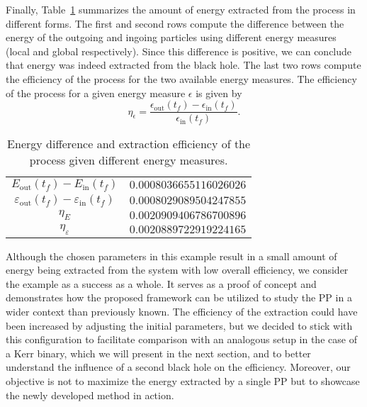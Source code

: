 Finally, Table~\ref{tab:arbitrary_penrose_kerr_example_efficiency} summarizes the amount of energy extracted from the process in different forms. The first and second rows compute the difference between the energy of the outgoing and ingoing particles using different energy measures (local and global respectively). Since this difference is positive, we can conclude that energy was indeed extracted from the black hole. The last two rows compute the efficiency of the process for the two available energy measures. The efficiency of the process for a given energy measure $\epsilon$ is given by
%
\begin{equation}
  \eta_\epsilon = \frac{\epsilon_\text{out}(t_f) - \epsilon_\text{in}(t_f)}{\epsilon_\text{in}(t_f)}.
  \label{eq:arbitrary_penrose_kerr_example_efficiency_formula}
\end{equation}

\begin{table}[]
  \centering
  \begin{tabular}{cc}
    \hline\hline
    $E_\text{out}(t_f)-E_\text{in}(t_f)$                     & $0.0008036655116026026$ \\
    $\varepsilon_\text{out}(t_f)-\varepsilon_\text{in}(t_f)$ & $0.0008029089504247855$ \\
    $\eta_E$                                                 & $0.0020909406786700896$ \\
    $\eta_\varepsilon$                                       & $0.0020889722919224165$ \\ \hline\hline
  \end{tabular}
  \caption{Energy difference and extraction efficiency of the process given different energy measures.}
  \label{tab:arbitrary_penrose_kerr_example_efficiency}
\end{table}

Although the chosen parameters in this example result in a small amount of energy being extracted from the system with low overall efficiency, we consider the example as a success as a whole. It serves as a proof of concept and demonstrates how the proposed framework can be utilized to study the PP in a wider context than previously known. The efficiency of the extraction could have been increased by adjusting the initial parameters, but we decided to stick with this configuration to facilitate comparison with an analogous setup in the case of a Kerr binary, which we will present in the next section, and to better understand the influence of a second black hole on the efficiency. Moreover, our objective is not to maximize the energy extracted by a single PP but to showcase the newly developed method in action.